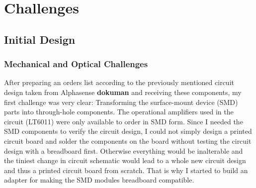 \chapter{Challenges}
\label{sec:challenges}


\section{Initial Design}
\subsection{Mechanical and Optical Challenges}
\label{sub:mechanicalChallenges}

After preparing an orders list according to the previously mentioned circuit design taken from Alphasense \textbf{dokuman} and receiving these components, my first challenge was very clear: Transforming the surface-mount device (SMD) parts into through-hole components. The operational amplifiers used in the circuit (LT6011) were only available to order in SMD form. Since I needed the SMD components to verify the circuit design, I could not simply design a printed circuit board and solder the components on the board without testing the circuit design with a breadboard first. Otherwise everything would be inalterable and the tiniest change in circuit schematic would lead to a whole new circuit design and thus a printed circuit board from scratch. That is why I started to build an adapter for making the SMD modules breadboard compatible. \par 
